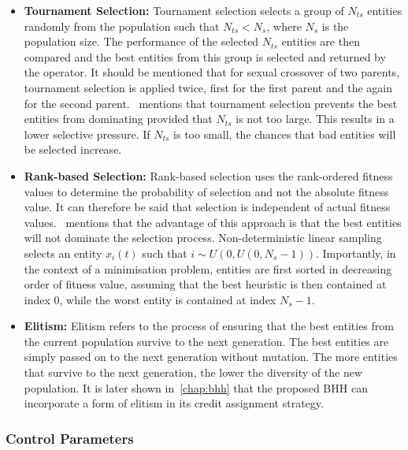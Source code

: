 \begin{itemize}
      \item \textbf{Tournament Selection: } Tournament selection selects a group of $N_{ts}$ entities randomly from the population such that $N_{ts} < N_{s}$, where $N_{s}$ is the population size. The performance of the selected $N_{ts}$ entities are then compared and the best entities from this group is selected and returned by the operator. It should be mentioned that for sexual crossover of two parents, tournament selection is applied twice, first for the first parent and the again for the second parent.~\citeauthor{ref:engelbrecht:2007}\cite{ref:engelbrecht:2007} mentions that tournament selection prevents the best entities from dominating provided that $N_{ts}$ is not too large. This results in a lower selective pressure. If $N_{ts}$ is too small, the chances that bad entities will be selected increase.

      \item \textbf{Rank-based Selection: } Rank-based selection uses the rank-ordered fitness values to determine the probability of selection and not the absolute fitness value. It can therefore be said that selection is independent of actual fitness values.~\citeauthor{ref:engelbrecht:2007}\cite{ref:engelbrecht:2007} mentions that the advantage of this approach is that the best entities will not dominate the selection process. Non-deterministic linear sampling selects an entity $x_{i}(t)$ such that $i \sim U(0, U(0, N_{s} - 1))$. Importantly, in the context of a minimisation problem, entities are first sorted in decreasing order of fitness value, assuming that the best heuristic is then contained at index 0, while the worst entity is contained at index $N_{s} - 1$.

      \item \textbf{Elitism: } Elitism refers to the process of ensuring that the best entities from the current population survive to the next generation. The best entities are simply passed on to the next generation without mutation. The more entities that survive to the next generation, the lower the diversity of the new population. It is later shown in~\ref{chap:bhh} that the proposed \acs{BHH} can incorporate a form of elitism in its credit assignment strategy.
\end{itemize}


\subsubsection{Control Parameters}
\label{sec:heuristics:mh:ga:control_parameters}

